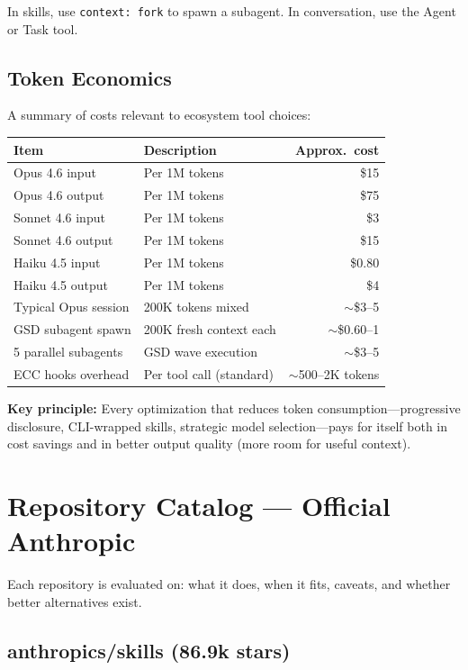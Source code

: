 \documentclass[11pt,a4paper]{article}
\begin{document}
In skills, use \texttt{context: fork} to spawn a subagent. In conversation, use the Agent or Task tool.

\subsection{Token Economics}

A summary of costs relevant to ecosystem tool choices:

\begin{tabularx}{\textwidth}{l X r}
\toprule
\textbf{Item} & \textbf{Description} & \textbf{Approx.\ cost} \\
\midrule
Opus 4.6 input & Per 1M tokens & \$15 \\
Opus 4.6 output & Per 1M tokens & \$75 \\
Sonnet 4.6 input & Per 1M tokens & \$3 \\
Sonnet 4.6 output & Per 1M tokens & \$15 \\
Haiku 4.5 input & Per 1M tokens & \$0.80 \\
Haiku 4.5 output & Per 1M tokens & \$4 \\
\midrule
Typical Opus session & 200K tokens mixed & $\sim$\$3--5 \\
GSD subagent spawn & 200K fresh context each & $\sim$\$0.60--1 \\
5 parallel subagents & GSD wave execution & $\sim$\$3--5 \\
ECC hooks overhead & Per tool call (standard) & $\sim$500--2K tokens \\
\bottomrule
\end{tabularx}

\textbf{Key principle:} Every optimization that reduces token consumption---progressive disclosure, CLI-wrapped skills, strategic model selection---pays for itself both in cost savings and in better output quality (more room for useful context).

\newpage

\section{Repository Catalog --- Official Anthropic}

Each repository is evaluated on: what it does, when it fits, caveats, and whether better alternatives exist.

\subsection{anthropics/skills (86.9k stars)}
\end{document}
